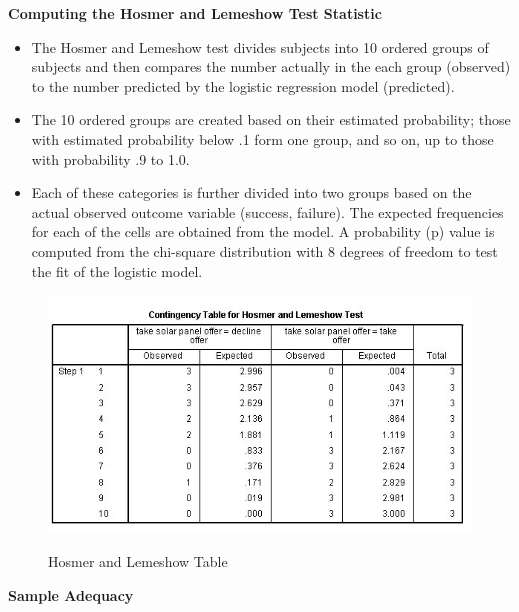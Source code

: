 \documentclass[a4paper,12pt]{article}
\begin{document}

\noindent \textbf{Computing the Hosmer and Lemeshow Test Statistic}

\begin{itemize}
	\item The Hosmer and Lemeshow test
	divides subjects into 10 ordered groups of subjects and then compares the number
	actually in the each group (observed) to the number predicted by the logistic regression
	model (predicted). 
	\item The 10 ordered groups are created based on their estimated probability; those with estimated probability below .1 form one group, and so on, up to those with probability .9 to 1.0.
	\item 
	Each of these categories is further divided into two groups based on the actual observed outcome variable (success, failure). The expected frequencies for each of the cells are obtained from the model. A probability (p) value is
	computed from the chi-square distribution with 8 degrees of freedom to test the fit of the logistic model.
	
\end{itemize}
\begin{figure}[h!]
	\begin{center}
		\includegraphics[scale=0.6]{images/Logistic6}\\
		\caption{Hosmer and Lemeshow Table}
	\end{center}
\end{figure}

\noindent \textbf{Sample Adequacy}\\
\end{document}

